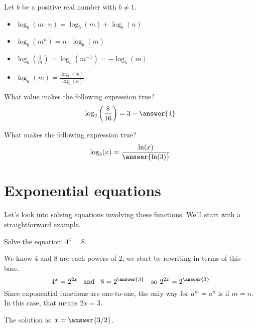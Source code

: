 \documentclass{ximera}
\begin{document}
Let $b$ be a positive real number with $b\ne 1$.
\begin{itemize}
\item $\log_b(m\cdot n) = \log_b(m) + \log_b(n)$
\item $\log_b(m^n) = n\cdot \log_b(m)$
\item $\log_b\left(\frac{1}{m}\right) = \log_b(m^{-1}) = -\log_b(m)$
\item $\log_a(m) = \frac{\log_b(m)}{\log_b(a)}$
\end{itemize}

\begin{question}
  What value makes the following expression true?
  \[
  \log_2\left(\frac{8}{16}\right) = 3-\answer{4}
  \]
\end{question}


\begin{question}
  What makes the following expression true?
  \[
  \log_3(x) = \frac{\ln(x)}{\answer{\ln(3)}}
  \]
\end{question}


\section{Exponential equations}
Let's look into solving equations involving these functions.  We'll start with a straightforward example.
\begin{example}
	Solve the equation: $\displaystyle 4^x = 8$.
	\begin{explanation}
		We know $4$ and $8$ are each powers of $2$, we start by rewriting in terms of this base.
		\[ 4^x = 2^{2x}  \,\,\, \textrm{ and } \,\,\, 8 =2^{\answer{3}} \,\,\,\, \textrm{ so } 2^{2x} = 2^{\answer{3}} \]
		Since exponential functions are one-to-one, the only way for $a^m = a^n$ is if $m=n$.  In this case,
		that means $\displaystyle 2x = 3$.
		
		The solution is: $\displaystyle x = \answer{3/2}$.
	\end{explanation}
\end{example}
\end{document}
